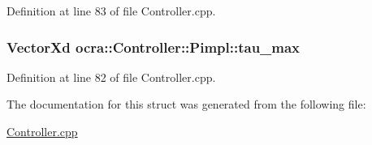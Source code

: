 Definition at line 83 of file Controller.\+cpp.

\subsubsection[{\texorpdfstring{tau\+\_\+max}{tau_max}}]{\setlength{\rightskip}{0pt plus 5cm}Vector\+Xd ocra\+::\+Controller\+::\+Pimpl\+::tau\+\_\+max}\hypertarget{structocra_1_1Controller_1_1Pimpl_a19486bfe59a11231eeabfd3b2b9abd39}{}\label{structocra_1_1Controller_1_1Pimpl_a19486bfe59a11231eeabfd3b2b9abd39}


Definition at line 82 of file Controller.\+cpp.



The documentation for this struct was generated from the following file\+:\begin{DoxyCompactItemize}
\item 
\hyperlink{Controller_8cpp}{Controller.\+cpp}\end{DoxyCompactItemize}
